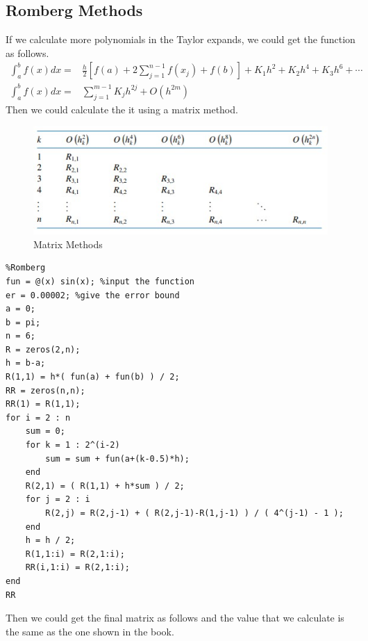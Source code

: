 \documentclass{article}
\begin{document}
\subsection{Romberg Methods}
If we calculate more polynomials in the Taylor expands, we could get the function as follows.
\begin{align}
    \int_{a}^{b} f(x) d x=&\frac{h}{2}\left[f(a)+2 \sum_{j=1}^{n-1} f\left(x_{j}\right)+f(b)\right]+K_{1} h^{2}+K_{2} h^{4}+K_{3} h^{6}+\cdots\nonumber\\
   \int_{a}^{b} f(x) d x=&\sum_{j=1}^{m-1} K_{j} h^{2 j}+O\left(h^{2 m}\right)\nonumber
\end{align}
Then we could calculate the it using a matrix method.
\begin{figure}[h]
\centerline{\includegraphics[width=0.65\linewidth]{TableR.JPG}}
\caption{Matrix Methods}
\label{RR}
\end{figure}
\begin{lstlisting}
%Romberg
fun = @(x) sin(x); %input the function
er = 0.00002; %give the error bound
a = 0;
b = pi;
n = 6;
R = zeros(2,n);
h = b-a;
R(1,1) = h*( fun(a) + fun(b) ) / 2;
RR = zeros(n,n);
RR(1) = R(1,1);
for i = 2 : n
    sum = 0;
    for k = 1 : 2^(i-2)
        sum = sum + fun(a+(k-0.5)*h);
    end
    R(2,1) = ( R(1,1) + h*sum ) / 2;
    for j = 2 : i
        R(2,j) = R(2,j-1) + ( R(2,j-1)-R(1,j-1) ) / ( 4^(j-1) - 1 );
    end
    h = h / 2;
    R(1,1:i) = R(2,1:i);
    RR(i,1:i) = R(2,1:i);
end
RR
\end{lstlisting}
Then we could get the final matrix as follows and the value that we calculate is the same as the one shown in the book.
\end{document}
